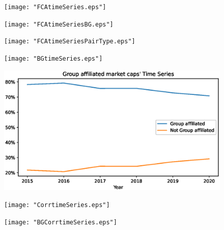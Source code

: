 \documentclass[12pt, a4paper]{article}
\begin{document}
\newpage
		\begin{figure}
	\centering  
	\texttt{[image: "FCAtimeSeries.eps"]}
	
\end{figure} 

			\begin{figure}
	\centering  
	\texttt{[image: "FCAtimeSeriesBG.eps"]}
\end{figure}    

\begin{figure}
	\centering  
	\texttt{[image: "FCAtimeSeriesPairType.eps"]}
\end{figure}




	\begin{figure}
	\centering  
	\texttt{[image: "BGtimeSeries.eps"]}
	
\end{figure}  

\begin{figure}
	\centering  
	\includegraphics[width=\linewidth]{"BGMarketCaptimeSeries.eps"}
	
\end{figure}
 
\begin{figure}
	\centering  
	\texttt{[image: "CorrtimeSeries.eps"]}
\end{figure}    

\begin{figure}
	\centering  
	\texttt{[image: "BGCorrtimeSeries.eps"]}
\end{figure}
\end{document}
